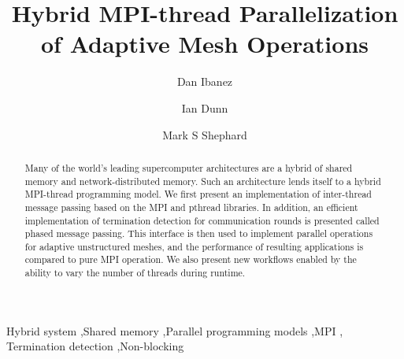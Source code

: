 \documentclass[final,1p,times]{elsarticle}
\begin{document}
\begin{frontmatter}



\title{Hybrid MPI-thread Parallelization of Adaptive Mesh Operations}


\author[a]{Dan Ibanez}
\author[a]{Ian Dunn}
\author[a]{Mark S Shephard}

\address[a]{
Scientific Computation Research Center,
Rensselaer Polytechnic Institute,
110 Eighth Street, Troy, NY 12180, USA
}

\begin{abstract}

Many of the world's leading supercomputer architectures
are a hybrid of shared memory and network-distributed memory.
Such an architecture lends itself to a hybrid MPI-thread programming
model.
We first present an implementation of inter-thread message passing
based on the MPI and pthread libraries.
In addition, an efficient implementation of termination detection
for communication rounds is presented called phased message passing.
This interface is then used to implement parallel operations
for adaptive unstructured meshes, and the performance of resulting
applications is compared to pure MPI operation.
We also present new workflows enabled by the ability to vary
the number of threads during runtime.

\end{abstract}

\begin{keyword}
Hybrid system \sep Shared memory \sep Parallel programming models \sep MPI \sep
Termination detection \sep Non-blocking


\end{keyword}

\end{frontmatter}
\end{document}

